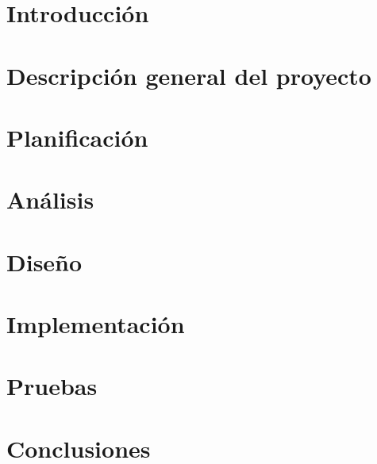\documentclass[a4paper,11pt]{book}
\begin{document}
\renewcommand{\figurename}{Figura}
\renewcommand{\listfigurename}{Indice de figuras}
\renewcommand{\tablename}{Tabla}
\renewcommand{\listtablename}{Indice de tablas}

\pagestyle{empty}

\cleardoublepage


\cleardoublepage
\pagestyle{plain}

\frontmatter %


\cleardoublepage

\tableofcontents
\listoffigures

\mainmatter %

\chapter{Introducción}

\clearpage

\chapter{Descripción general del proyecto}

\clearpage

\chapter{Planificación}

\clearpage

\chapter{Análisis}

\clearpage

\chapter{Diseño}

\clearpage

\chapter{Implementación}

\clearpage

\chapter{Pruebas}

\clearpage

\chapter{Conclusiones}

\clearpage





\clearpage

\end{document}
